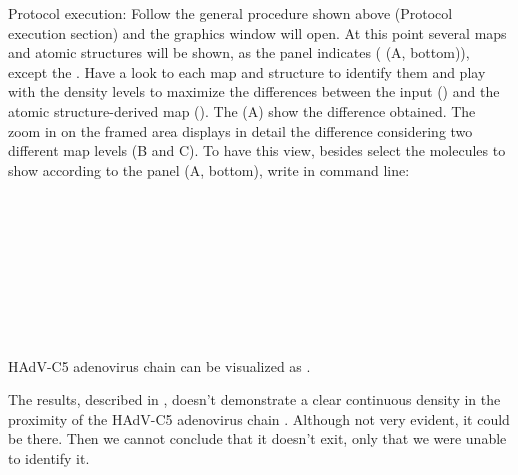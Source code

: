 \begin{itemize}
                        Protocol execution: Follow the general procedure shown above (Protocol execution section) and the \chimera graphics window will open. At this point several maps and atomic structures will be shown, as the  panel indicates ( (A, bottom)), except the  . Have a look to each map and structure to identify them and play with the density levels to maximize the differences between the input  () and the  atomic structure-derived map (). The  (A) show the difference  obtained. The zoom in on the framed area displays in detail the difference considering two different map levels (B and C). To have this view, besides select the molecules to show according to the  panel (A, bottom), write in \chimera command line:\\
                        \\
                        \\
                        \\
                        \\
                        \\
                        \\
                        \\
                        \\
                        \\
                        \ttt
                        HAdV-C5 adenovirus chain  can be visualized as  .  
                        
                        
                        The results, described in , doesn't demonstrate a clear continuous density in the proximity of the HAdV-C5 adenovirus chain . Although not very evident, it could be there. Then we cannot conclude that it doesn't exit, only that we were unable to identify it.
                            

\end{itemize}
